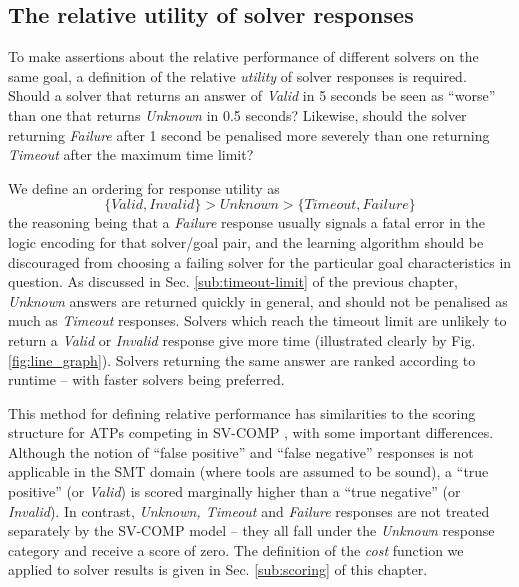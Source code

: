 \subsection{The relative utility of solver responses}
\label{sub:rel-util}

To make assertions about the relative performance of different solvers on the same goal, a definition of the relative \textit{utility} of solver responses is required.
Should a solver that returns an answer of \textit{Valid} in 5 seconds be seen as ``worse'' than one that returns \textit{Unknown} in 0.5 seconds? 
Likewise, should the solver returning \textit{Failure} after 1 second be penalised more severely than one returning \textit{Timeout} after the maximum time limit?

We define an ordering for response utility as 
\[
\lbrace Valid, Invalid\rbrace > Unknown > \lbrace Timeout, Failure\rbrace
\]  
the reasoning being that a \textit{Failure} response usually signals a fatal error in the logic encoding for that solver/goal pair, and the learning algorithm should be discouraged from choosing a failing solver for the particular goal characteristics in question. 
As discussed in Sec. \ref{sub:timeout-limit} of the previous chapter, \textit{Unknown} answers are returned quickly in general, and should not be penalised as much as \textit{Timeout} responses. 
Solvers which reach the timeout limit are unlikely to return a \textit{Valid} or \textit{Invalid} response give more time (illustrated clearly by Fig. \ref{fig:line_graph}).
Solvers returning the same answer are ranked according to runtime -- with faster solvers being preferred.

This method for defining relative performance has similarities to the scoring structure for ATPs competing in SV-COMP \cite{Beyer2016, SVCOMP}, with some important differences. 
Although the notion of ``false positive'' and ``false negative'' responses is not applicable in the SMT domain (where tools are assumed to be sound), a ``true positive'' (or \textit{Valid}) is scored marginally higher than a ``true negative'' (or \textit{Invalid}). 
In contrast, \textit{Unknown, Timeout} and \textit{Failure} responses are not treated separately by the SV-COMP model -- they all fall under the \textit{Unknown} response category and receive a score of zero.
The definition of the \textit{cost} function we applied to solver results is given in Sec. \ref{sub:scoring} of this chapter. 

